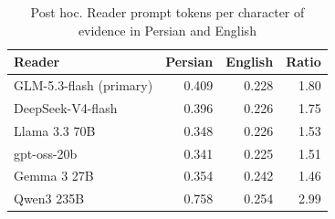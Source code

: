 \begin{table}[tp]
\caption{Post hoc. Reader prompt tokens per character of evidence in Persian and English}
\label{tab:tokenizers}
\centering
\footnotesize
\setlength{\tabcolsep}{4pt}
\begin{tabular}{@{}p{2.6cm}rrr@{}}
\toprule
Reader & Persian & English & Ratio \\
\midrule
GLM-5.3-flash (primary) & 0.409 & 0.228 & 1.80 \\
DeepSeek-V4-flash & 0.396 & 0.226 & 1.75 \\
Llama 3.3 70B & 0.348 & 0.226 & 1.53 \\
gpt-oss-20b & 0.341 & 0.225 & 1.51 \\
Gemma 3 27B & 0.354 & 0.242 & 1.46 \\
Qwen3 235B & 0.758 & 0.254 & 2.99 \\
\bottomrule
\end{tabular}
\end{table}
